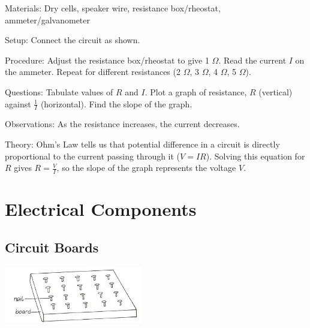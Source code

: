 \begin{multicols}{2}
\begin{description*}
\item[Materials:]{Dry cells, speaker wire, resistance box/rheostat, ammeter/galvanometer}
\item[Setup:]{Connect the circuit as shown.}
\item[Procedure:]{Adjust the resistance box/rheostat to give 1 $\Omega$. Read the current $I$ on the ammeter. Repeat for different resistances (2 $\Omega$, 3 $\Omega$, 4 $\Omega$, 5 $\Omega$).}
\item[Questions:]{Tabulate values of $R$ and $I$. Plot a graph of resistance, $R$ (vertical) against $\frac{1}{I}$ (horizontal). Find the slope of the graph.}
\item[Observations:]{As the resistance increases, the current decreases.}
\item[Theory:]{Ohm's Law tells us that potential difference in a circuit is directly proportional to the current passing through it ($V = IR$). Solving this equation for $R$ gives $R = \frac{V}{I}$, so the slope of the graph represents the voltage $V$.}
\end{description*}


\section*{Electrical Components}


\subsection{Circuit Boards}

\begin{center}
\includegraphics[width=0.45\textwidth]{./img/vso/circuit-board.jpg}
\end{center}


\end{multicols}
